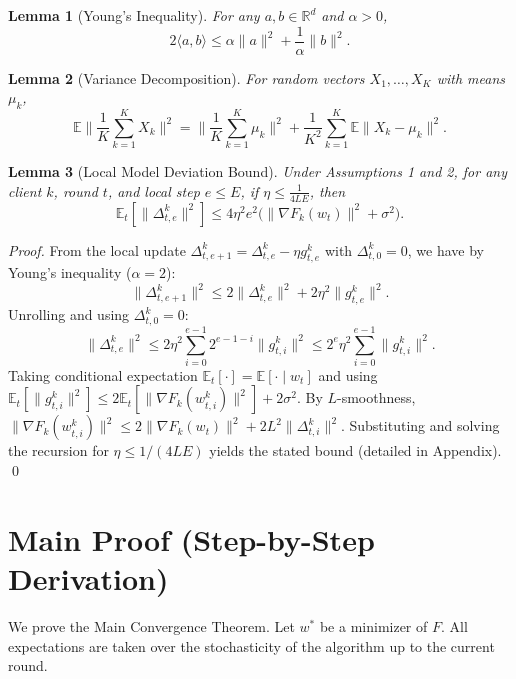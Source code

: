 \documentclass{article}
\newtheorem{lemma}{Lemma}
\begin{document}
\begin{lemma}[Young's Inequality]
For any $a,b \in \mathbb{R}^d$ and $\alpha > 0$,
\begin{equation}
2\langle a, b \rangle \le \alpha \|a\|^2 + \frac{1}{\alpha}\|b\|^2.
\end{equation}
\end{lemma}

\begin{lemma}[Variance Decomposition]
For random vectors $X_1,\dots,X_K$ with means $\mu_k$,
\begin{equation}
\mathbb{E}\Big\|\frac{1}{K}\sum_{k=1}^K X_k\Big\|^2 = \Big\|\frac{1}{K}\sum_{k=1}^K \mu_k\Big\|^2 + \frac{1}{K^2}\sum_{k=1}^K \mathbb{E}\|X_k - \mu_k\|^2.
\end{equation}
\end{lemma}

\begin{lemma}[Local Model Deviation Bound] \label{lem:deviation}
Under Assumptions 1 and 2, for any client $k$, round $t$, and local step $e \le E$, if $\eta \le \frac{1}{4LE}$, then
\begin{equation}
\mathbb{E}_t[\|\Delta_{t,e}^k\|^2] \le 4\eta^2 e^2 \Big( \|\nabla F_k(w_t)\|^2 + \sigma^2 \Big).
\end{equation}
\end{lemma}
\begin{proof}
From the local update $\Delta_{t,e+1}^k = \Delta_{t,e}^k - \eta g_{t,e}^k$ with $\Delta_{t,0}^k=0$, we have by Young's inequality ($\alpha=2$):
\begin{equation}
\|\Delta_{t,e+1}^k\|^2 \le 2\|\Delta_{t,e}^k\|^2 + 2\eta^2 \|g_{t,e}^k\|^2.
\end{equation}
Unrolling and using $\Delta_{t,0}^k=0$:
\begin{equation}
\|\Delta_{t,e}^k\|^2 \le 2\eta^2 \sum_{i=0}^{e-1} 2^{e-1-i} \|g_{t,i}^k\|^2 \le 2^e \eta^2 \sum_{i=0}^{e-1} \|g_{t,i}^k\|^2.
\end{equation}
Taking conditional expectation $\mathbb{E}_t[\cdot] = \mathbb{E}[\cdot \mid w_t]$ and using $\mathbb{E}_t[\|g_{t,i}^k\|^2] \le 2\mathbb{E}_t[\|\nabla F_k(w_{t,i}^k)\|^2] + 2\sigma^2$. By $L$-smoothness, $\|\nabla F_k(w_{t,i}^k)\|^2 \le 2\|\nabla F_k(w_t)\|^2 + 2L^2 \|\Delta_{t,i}^k\|^2$. Substituting and solving the recursion for $\eta \le 1/(4LE)$ yields the stated bound (detailed in Appendix). \qed
\end{proof}

\section*{Main Proof (Step-by-Step Derivation)}
We prove the Main Convergence Theorem. Let $w^*$ be a minimizer of $F$. All expectations are taken over the stochasticity of the algorithm up to the current round.
\end{document}
